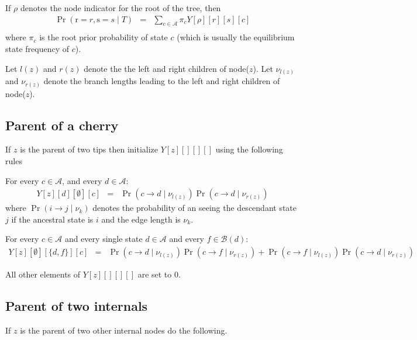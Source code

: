 \documentclass[11pt]{article}
\begin{document}
If $\rho$ denotes the node indicator for the root of the tree, then
\begin{eqnarray*}
\Pr(\mbox{r}=r, \mbox{s}=s\mid T) & = & \sum_{c\in\mathcal{A}} \pi_c Y[\rho][r][s][c]\\
\end{eqnarray*}
where $\pi_c$ is the root prior probability of state $c$ (which is
usually the equilibrium state frequency of $c$).


Let $l(z)$ and $r(z)$ denote the the left and right children of node($z$).
Let $\nu_{l(z)}$ and $\nu_{r(z)}$ denote the  branch lengths leading to the left and right children of node($z$).

\subsection{Parent of a cherry}
If $z$ is the parent of two tips then initialize $Y[z][][][]$ using the following rules

For every $c\in \mathcal{A}$, and every $d\in \mathcal{A}$:
\begin{eqnarray*}
Y[z][d][\emptyset][c] & = & \Pr(c\rightarrow d\mid \nu_{l(z)})\Pr(c\rightarrow d\mid \nu_{r(z)})
\end{eqnarray*}
where  $\Pr(i\rightarrow j\mid \nu_{k})$ denotes the probability of an 
	seeing the descendant state $j$ if the ancestral state is $i$ and 
	the edge length is $\nu_{k}$.


For every $c\in \mathcal{A}$ and every single state $d \in \mathcal{A}$ and
every $f\in \mathcal{B}(d)$:
\begin{eqnarray*}
Y[z][\emptyset][\{d, f\}][c] & = & \Pr(c\rightarrow d\mid \nu_{l(z)})\Pr(c\rightarrow f\mid \nu_{r(z)}) + \Pr(c\rightarrow f\mid \nu_{l(z)})\Pr(c\rightarrow d\mid \nu_{r(z)}) 
\end{eqnarray*}


All other elements of $Y[z][][][]$ are set to 0.

\subsection{Parent of two internals}
If $z$ is the parent of two other internal nodes do the following.
\end{document}
